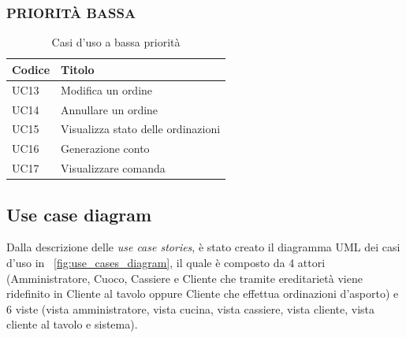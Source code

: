 \subsubsection{PRIORITÀ BASSA}
\begin{table}[htbp]
	\centering
	\begin{tabularx}{\textwidth}{|>{\centering\arraybackslash} m{4em}| >{\raggedright\arraybackslash}X |}
		\hline
		\textbf{Codice} & \textbf{Titolo} \\ [0.5ex]
		\hline\hline
		UC13 & Modifica un ordine  \\
		\hline
		UC14 & Annullare un ordine  \\
		\hline
		UC15 & Visualizza stato delle ordinazioni \\
		\hline
		UC16 & Generazione conto   \\
		\hline
		UC17 & Visualizzare comanda   \\
		\hline
	\end{tabularx}
	\caption{Casi d'uso a bassa priorità}
	\label{tab:use_cases_low_priority}
\end{table}


\subsection{Use case diagram}

Dalla descrizione delle \textit{use case stories}, è stato creato il diagramma UML dei casi d'uso in \figurename~\ref{fig:use_cases_diagram}, il quale è composto da 4 attori (Amministratore, Cuoco, Cassiere e Cliente che tramite ereditarietà viene ridefinito in Cliente al tavolo oppure Cliente che effettua ordinazioni d’asporto) e 6 viste (vista amministratore, vista cucina, vista cassiere, vista cliente, vista cliente al tavolo e sistema).

